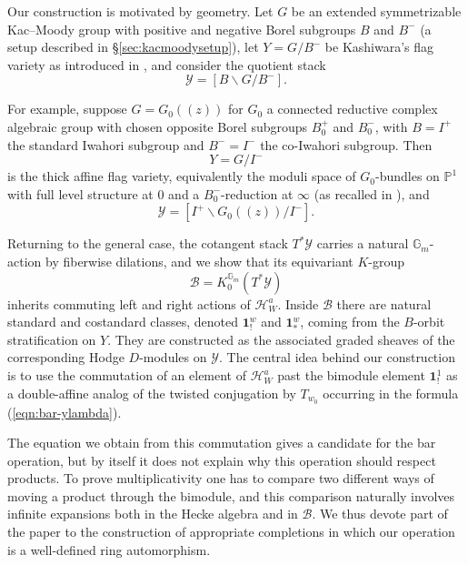 \documentclass{amsart}
\newcommand{\bone}{\mathbf{1}}
\newcommand{\Ha}{\mathcal{H}_{W}^a}
\newcommand{\B}{\mathcal{B}}
\theoremstyle{definition}
\numberwithin{equation}{section}
\begin{document}
Our construction is motivated by geometry. Let $G$ be an extended symmetrizable Kac--Moody group with positive and negative Borel subgroups $B$ and $B^-$ (a setup described in \S \ref{sec:kacmoodysetup}), let $Y=G/B^-$ be Kashiwara's  flag variety as introduced in \cite{K}, and consider the quotient stack
\[
\mathcal Y=[B\backslash G/B^-].
\]

For example, suppose $G=G_0(\!(z)\!)$ for $G_0$ a connected reductive complex algebraic group with chosen opposite Borel subgroups $B_0^+$ and $B_0^-$, with $B=I^+$ the standard Iwahori subgroup and $B^-=I^-$ the co-Iwahori subgroup. Then
\[
Y=G/I^-
\]
is the thick affine flag variety, equivalently the moduli space of $G_0$-bundles on $\mathbb P^1$ with full level structure at $0$ and a $B_0^-$-reduction at $\infty$ (as recalled in \cite{Yun}), and
\[
\mathcal Y=[I^+\backslash G_0(\!(z)\!)/I^-].
\]

Returning to the general case, the cotangent stack $T^*\mathcal Y$ carries a natural $\mathbb G_m$-action { by fiberwise dilations}, and we show that its equivariant $K$-group
\[
\B = K_0^{\mathbb G_m}(T^*\mathcal Y)
\]
inherits commuting left and right actions of $\Ha$. Inside $\B$ there are natural standard and costandard classes, denoted $\bone_!^w$ and $\bone_*^w$, coming from the $B$-orbit stratification on $Y$. { They are constructed as the associated graded sheaves of the corresponding Hodge $D$-modules on $\mathcal{Y}$.} The central idea behind our construction is to use the commutation of an element of $\Ha$ past the bimodule element $\bone_!^1$ as a double-affine analog of the twisted conjugation by $T_{w_0}$ occurring in the formula (\ref{eqn:bar-ylambda}).


The equation we obtain from this commutation gives a candidate for the bar operation, but by itself it does not explain
why this operation should respect products. To prove multiplicativity one has to
compare two different ways of moving a product through the bimodule, and this
comparison naturally involves infinite expansions both in the Hecke algebra and in $\B$. We thus devote part of the paper to the construction of appropriate
completions in which our operation is a well-defined ring automorphism.
\end{document}

